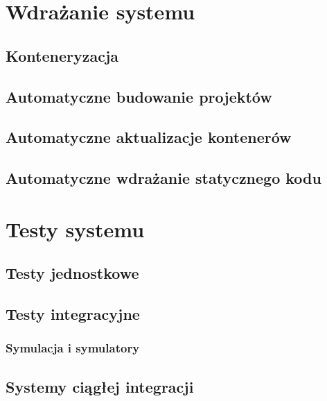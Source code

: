 
\chapter{Wdrażanie systemu}

\section{Konteneryzacja}
\section{Automatyczne budowanie projektów}
\section{Automatyczne aktualizacje kontenerów}
\section{Automatyczne wdrażanie statycznego kodu}


\chapter{Testy systemu}

\section{Testy jednostkowe}
\section{Testy integracyjne}
\subsection{Symulacja i symulatory}
\section{Systemy ciągłej integracji}
